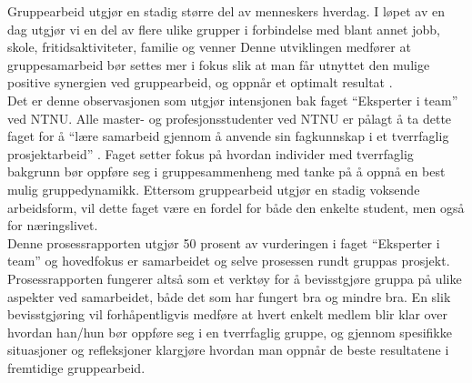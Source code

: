 Gruppearbeid utgjør en stadig større del av menneskers hverdag. I løpet av en dag utgjør vi en del av flere ulike grupper i forbindelse med blant annet jobb, skole, fritidsaktiviteter, familie og venner \citep{gruppeteori} Denne utviklingen medfører at gruppesamarbeid bør settes mer i fokus slik at man får utnyttet den mulige positive synergien ved gruppearbeid, og oppnår et optimalt resultat \citep{gruppeteori}.\\

Det er denne observasjonen som utgjør intensjonen bak faget “Eksperter i team” ved NTNU. Alle master- og profesjonsstudenter ved NTNU er pålagt å ta dette faget for å “lære samarbeid gjennom å anvende sin fagkunnskap i et tverrfaglig prosjektarbeid” \citep{website:emnebeskrivelse}. Faget setter fokus på hvordan individer med tverrfaglig bakgrunn bør oppføre seg i gruppesammenheng med tanke på å oppnå en best mulig gruppedynamikk. Ettersom gruppearbeid utgjør en stadig voksende arbeidsform, vil dette faget være en fordel for både den enkelte student, men også for næringslivet.\\

Denne prosessrapporten utgjør 50 prosent av vurderingen i faget “Eksperter i team” og hovedfokus er samarbeidet og selve prosessen rundt gruppas prosjekt. Prosessrapporten fungerer altså som et verktøy for å bevisstgjøre gruppa på ulike aspekter ved samarbeidet, både det som har fungert bra og mindre bra. En slik bevisstgjøring vil forhåpentligvis medføre at hvert enkelt medlem blir klar over hvordan han/hun bør oppføre seg i en tverrfaglig gruppe, og gjennom spesifikke situasjoner og refleksjoner klargjøre hvordan man oppnår de beste resultatene i fremtidige gruppearbeid.
